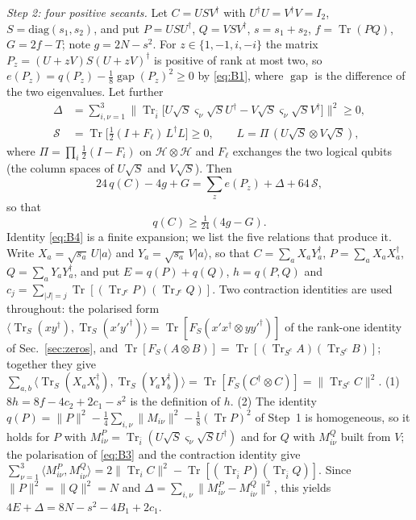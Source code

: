 \documentclass[aps,pra,twocolumn,superscriptaddress,nofootinbib,longbibliography]{revtex4-2}
\newcommand{\Hh}{\mathcal H}
\newcommand{\ip}[2]{\langle #1,#2\rangle}
\newcommand{\ket}[1]{|#1\rangle}
\DeclareMathOperator{\Tr}{Tr}
\theoremstyle{plain}
\theoremstyle{definition}
\theoremstyle{remark}
\begin{document}
\emph{Step 2: four positive secants.} Let $C=USV^\dagger$ with $U^\dagger U=V^\dagger V=I_2$, $S=\mathrm{diag}(s_1,s_2)$, and put $P=USU^\dagger$, $Q=VSV^\dagger$, $s=s_1+s_2$, $f=\Tr(PQ)$, $G=2f-T$; note $g=2N-s^2$. For $z\in\{1,-1,i,-i\}$ the matrix $P_z=(U+zV)S(U+zV)^\dagger$ is positive of rank at most two, so $e(P_z)=q(P_z)-\tfrac18\operatorname{gap}(P_z)^2\ge0$ by \eqref{eq:B1}, where $\operatorname{gap}$ is the difference of the two eigenvalues. Let further
\begin{align*}
\Delta&=\sum_{i,\nu=1}^3\bigl\|\Tr_{\bar i}\bigl[U\sqrt S\varsigma_\nu\sqrt SU^\dagger-V\sqrt S\varsigma_\nu\sqrt SV^\dagger\bigr]\bigr\|^2\ge0,\\
\mathcal S&=\Tr\bigl[\tfrac12(I+F_\ell)\,L^\dagger L\bigr]\ge0,\qquad L=\Pi\,(U\sqrt S\otimes V\sqrt S),
\end{align*}
where $\Pi=\prod_i\tfrac12(I-F_i)$ on $\Hh\otimes\Hh$ and $F_\ell$ exchanges the two logical qubits (the column spaces of $U\sqrt S$ and $V\sqrt S$). Then
\begin{equation}\label{eq:B4}
24\,q(C)-4g+G=\sum_ze(P_z)+\Delta+64\,\mathcal S ,
\end{equation}
so that
\begin{equation}\label{eq:B5}
q(C)\ge\tfrac1{24}(4g-G).
\end{equation}
Identity \eqref{eq:B4} is a finite expansion; we list the five relations that produce it. Write $X_a=\sqrt{s_a}\,U\ket a$ and $Y_a=\sqrt{s_a}\,V\ket a$, so that $C=\sum_aX_aY_a^\dagger$, $P=\sum_aX_aX_a^\dagger$, $Q=\sum_aY_aY_a^\dagger$, and put $E=q(P)+q(Q)$, $h=q(P,Q)$ and $c_j=\sum_{|J|=j}\Tr[(\Tr_{J^c}P)(\Tr_{J^c}Q)]$. Two contraction identities are used throughout: the polarised form $\ip{\Tr_S(xy^\dagger)}{\Tr_S(x'y'^\dagger)}=\Tr[F_S(x'x^\dagger\otimes yy'^\dagger)]$ of the rank-one identity of Sec.~\ref{sec:zeros}, and $\Tr[F_S(A\otimes B)]=\Tr[(\Tr_{S^c}A)(\Tr_{S^c}B)]$; together they give $\sum_{a,b}\ip{\Tr_S(X_aX_b^\dagger)}{\Tr_S(Y_aY_b^\dagger)}=\Tr[F_S(C^\dagger\otimes C)]=\|\Tr_{S^c}C\|^2$.
(1) $8h=8f-4c_2+2c_1-s^2$ is the definition of $h$.
(2) The identity $q(P)=\|P\|^2-\tfrac14\sum_{i,\nu}\|M_{i\nu}\|^2-\tfrac18(\Tr P)^2$ of Step~1 is homogeneous, so it holds for $P$ with $M^P_{i\nu}=\Tr_{\bar i}(U\sqrt S\varsigma_\nu\sqrt SU^\dagger)$ and for $Q$ with $M^Q_{i\nu}$ built from $V$; the polarisation of \eqref{eq:B3} and the contraction identity give $\sum_{\nu=1}^3\ip{M^P_{i\nu}}{M^Q_{i\nu}}=2\|\Tr_iC\|^2-\Tr[(\Tr_{\bar i}P)(\Tr_{\bar i}Q)]$. Since $\|P\|^2=\|Q\|^2=N$ and $\Delta=\sum_{i,\nu}\|M^P_{i\nu}-M^Q_{i\nu}\|^2$, this yields $4E+\Delta=8N-s^2-4B_1+2c_1$.
\end{document}
